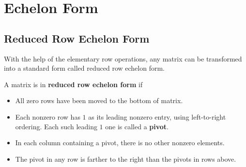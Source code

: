 \documentclass[math101_lecturenotes_ku.tex]{subfiles}
\begin{document}
\section{Echelon Form}
\subsection{Reduced Row Echelon Form}
With the help of the elementary row operations, any matrix can be transformed into a standard form called reduced row echelon form.
\begin{mdframed}[style=myframe]
        A matrix is in \textbf{reduced row echelon form} if
        \begin{itemize}
            \item All zero rows have been moved to the bottom of matrix.
            \item Each nonzero row has $1$ as its leading nonzero entry, using left-to-right ordering. Each such leading $1$ one is called a \textbf{pivot}.
            \item In each column containing a pivot, there is no other nonzero elements.
            \item The pivot in any row is farther to the right than the pivots in rows above.
        \end{itemize}
\end{mdframed}
\end{document}

